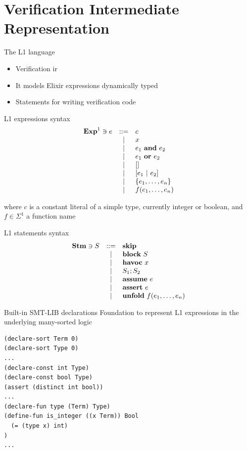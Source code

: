 \documentclass{beamer}
\begin{document}
  \section{Verification Intermediate Representation}
  \begin{frame}{The L1 language}
    \begin{itemize}
      \item Verification \gls*{ir} 
      \item It models Elixir expressions dynamically typed
      \item Statements for writing verification code
    \end{itemize}
  \end{frame}
  \begin{frame}{L1 expressions syntax}
    \[
      \begin{array}{rcll}
        \mathbf{Exp}^{1} \ni e & ::= & c \\
        & | & x \\
        & | & e_1~\textbf{and}~e_2 \\
        & | & e_1~\textbf{or}~e_2 \\
        & | & [] \\
        & | & [e_1~|~e_2] \\
        & | & \{e_1, \ldots, e_n\} \\
        & | & f(e_1, \ldots, e_n) \\
      \end{array}
    \]

    where $c$ is a constant literal of a simple type, currently integer or 
    boolean, and $f \in \Sigma^1$ a function name
  \end{frame}
  \begin{frame}{L1 statements syntax}
    \[
      \begin{array}{rcll}
        \mathbf{Stm} \ni S & ::= & \textbf{skip} \\
        & | & \textbf{block}~S \\
        & | & \textbf{havoc}~x \\
        & | & S_1;S_2 \\
        & | & \textbf{assume}~e \\
        & | & \textbf{assert}~e \\
        & | & \textbf{unfold}~f(e_1, \dots, e_n) \\
      \end{array}
    \]
  \end{frame}
  \begin{frame}[fragile]{Built-in SMT-LIB declarations}
    Foundation to represent L1 expressions in the underlying many-sorted logic
    \begin{verbatim}
(declare-sort Term 0)
(declare-sort Type 0)
...
(declare-const int Type)
(declare-const bool Type)
(assert (distinct int bool))
...
(declare-fun type (Term) Type)
(define-fun is_integer ((x Term)) Bool 
  (= (type x) int)
)
...
    \end{verbatim}
  \end{frame}
\end{document}
